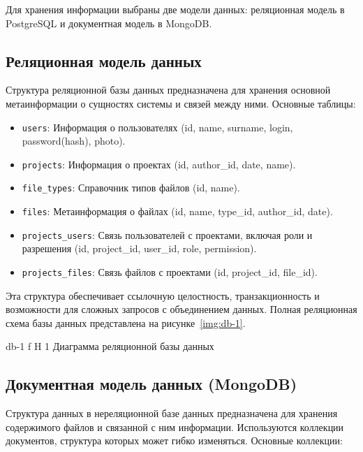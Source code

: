 Для хранения информации выбраны две модели данных: реляционная модель в PostgreSQL и документная модель в MongoDB.

\subsection{Реляционная модель данных}

Структура реляционной базы данных предназначена для хранения основной метаинформации о сущностях системы и связей между ними. 
Основные таблицы:

\begin{itemize}
    \item \texttt{users}: Информация о пользователях (id, name, surname, login, password(hash), photo).
    \item \texttt{projects}: Информация о проектах (id, author\_id, date, name).
    \item \texttt{file\_types}: Справочник типов файлов (id, name).
    \item \texttt{files}: Метаинформация о файлах (id, name, type\_id, author\_id, date).
    \item \texttt{projects\_users}: Связь пользователей с проектами, включая роли и разрешения (id, project\_id, user\_id, role, permission).
    \item \texttt{projects\_files}: Связь файлов с проектами (id, project\_id, file\_id).
\end{itemize}

\clearpage
Эта структура обеспечивает ссылочную целостность, транзакционность и возможности для сложных запросов с объединением данных. 
Полная реляционная схема базы данных представлена на рисунке~\ref{img:db-1}.

	{db-1}
	{f}
	{H}
	{1\textwidth}
	{Диаграмма реляционной базы данных}

\subsection{Документная модель данных (MongoDB)}

Структура данных в нереляционной базе данных предназначена для хранения содержимого файлов и связанной с ним информации. 
Используются коллекции документов, структура которых может гибко изменяться.
\clearpage
Основные коллекции:

